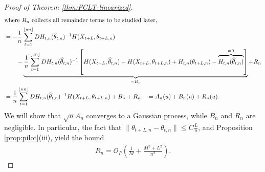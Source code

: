\documentclass[10pt, a4paper]{article}
\theoremstyle{assumption}
\theoremstyle{definition}
\theoremstyle{theorem}
\begin{document}
\begin{proof}[Proof of Theorem \ref{thm:FCLT-linearized}]
\begin{align}
        \intertext{where $R_n$ collects all remainder terms to be studied later,}
        &=-\frac{1}{n} \sum_{t=1}^{\lfloor un \rfloor} DH_{t,n}(\widehat{\theta}_{t,n})^{-1} H(X_{t+L}, \theta_{t+L,n})\nonumber \\
        &\qquad - \underbrace{\frac{1}{n} \sum_{t=1}^{\lfloor un \rfloor} DH_{t,n}(\widehat{\theta}_{t,n})^{-1} \left[ H(X_{t+L}, \widehat{\theta}_{t,n}) - H(X_{t+L}, \theta_{t+L,n}) + H_{t,n}(\theta_{t+L,n}) -  \overbrace{H_{t,n}(\widehat{\theta}_{t,n})}^{=0}  \right]}_{=B_n} + R_n \nonumber \\
        &= \frac{1}{n} \sum_{t=1}^{\lfloor un \rfloor} DH_{t,n}(\widehat{\theta}_{t,n})^{-1} H(X_{t+L}, \theta_{t+L,n}) + B_n + R_n
        \quad = A_n(u)+B_n(u)+R_n(u). \label{eqn:decomp-1}
    \end{align}
    We will show that $\sqrt{n}A_n$ converges to a Gaussian process, while $B_n$ and $R_n$ are negligible.
    In particular, the fact that $\|\theta_{t+L,n}-\theta_{t,n}\|\leq C \frac{L}{n}$, and Proposition \ref{prop:pilot}(iii), yield the bound
    \begin{align}
        R_n = \mathcal{O}_P \left( \tfrac{1}{M}+\tfrac{M^2+L^2}{n^2} \right). \label{eqn:bound-Rn}
    \end{align}


\end{proof}
\end{document}
